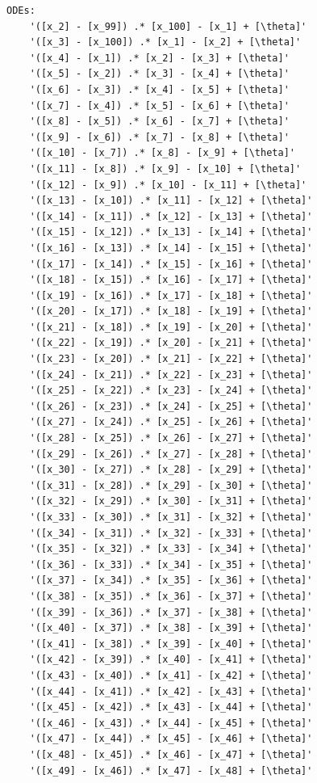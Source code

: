         \begin{verbatim}ODEs:
    '([x_2] - [x_99]) .* [x_100] - [x_1] + [\theta]'
    '([x_3] - [x_100]) .* [x_1] - [x_2] + [\theta]'
    '([x_4] - [x_1]) .* [x_2] - [x_3] + [\theta]'
    '([x_5] - [x_2]) .* [x_3] - [x_4] + [\theta]'
    '([x_6] - [x_3]) .* [x_4] - [x_5] + [\theta]'
    '([x_7] - [x_4]) .* [x_5] - [x_6] + [\theta]'
    '([x_8] - [x_5]) .* [x_6] - [x_7] + [\theta]'
    '([x_9] - [x_6]) .* [x_7] - [x_8] + [\theta]'
    '([x_10] - [x_7]) .* [x_8] - [x_9] + [\theta]'
    '([x_11] - [x_8]) .* [x_9] - [x_10] + [\theta]'
    '([x_12] - [x_9]) .* [x_10] - [x_11] + [\theta]'
    '([x_13] - [x_10]) .* [x_11] - [x_12] + [\theta]'
    '([x_14] - [x_11]) .* [x_12] - [x_13] + [\theta]'
    '([x_15] - [x_12]) .* [x_13] - [x_14] + [\theta]'
    '([x_16] - [x_13]) .* [x_14] - [x_15] + [\theta]'
    '([x_17] - [x_14]) .* [x_15] - [x_16] + [\theta]'
    '([x_18] - [x_15]) .* [x_16] - [x_17] + [\theta]'
    '([x_19] - [x_16]) .* [x_17] - [x_18] + [\theta]'
    '([x_20] - [x_17]) .* [x_18] - [x_19] + [\theta]'
    '([x_21] - [x_18]) .* [x_19] - [x_20] + [\theta]'
    '([x_22] - [x_19]) .* [x_20] - [x_21] + [\theta]'
    '([x_23] - [x_20]) .* [x_21] - [x_22] + [\theta]'
    '([x_24] - [x_21]) .* [x_22] - [x_23] + [\theta]'
    '([x_25] - [x_22]) .* [x_23] - [x_24] + [\theta]'
    '([x_26] - [x_23]) .* [x_24] - [x_25] + [\theta]'
    '([x_27] - [x_24]) .* [x_25] - [x_26] + [\theta]'
    '([x_28] - [x_25]) .* [x_26] - [x_27] + [\theta]'
    '([x_29] - [x_26]) .* [x_27] - [x_28] + [\theta]'
    '([x_30] - [x_27]) .* [x_28] - [x_29] + [\theta]'
    '([x_31] - [x_28]) .* [x_29] - [x_30] + [\theta]'
    '([x_32] - [x_29]) .* [x_30] - [x_31] + [\theta]'
    '([x_33] - [x_30]) .* [x_31] - [x_32] + [\theta]'
    '([x_34] - [x_31]) .* [x_32] - [x_33] + [\theta]'
    '([x_35] - [x_32]) .* [x_33] - [x_34] + [\theta]'
    '([x_36] - [x_33]) .* [x_34] - [x_35] + [\theta]'
    '([x_37] - [x_34]) .* [x_35] - [x_36] + [\theta]'
    '([x_38] - [x_35]) .* [x_36] - [x_37] + [\theta]'
    '([x_39] - [x_36]) .* [x_37] - [x_38] + [\theta]'
    '([x_40] - [x_37]) .* [x_38] - [x_39] + [\theta]'
    '([x_41] - [x_38]) .* [x_39] - [x_40] + [\theta]'
    '([x_42] - [x_39]) .* [x_40] - [x_41] + [\theta]'
    '([x_43] - [x_40]) .* [x_41] - [x_42] + [\theta]'
    '([x_44] - [x_41]) .* [x_42] - [x_43] + [\theta]'
    '([x_45] - [x_42]) .* [x_43] - [x_44] + [\theta]'
    '([x_46] - [x_43]) .* [x_44] - [x_45] + [\theta]'
    '([x_47] - [x_44]) .* [x_45] - [x_46] + [\theta]'
    '([x_48] - [x_45]) .* [x_46] - [x_47] + [\theta]'
    '([x_49] - [x_46]) .* [x_47] - [x_48] + [\theta]'

\end{verbatim}
